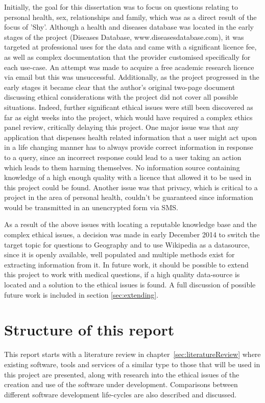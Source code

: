 \documentclass[authoryearcitations]{UoYCSproject}
\begin{document}
Initially, the goal for this dissertation was to focus on questions relating to personal health, sex, relationships and family, which was as a direct result of the focus of 'Shy'.  Although a health and diseases database was located in the early stages of the project (Diseases Database, www.diseasesdatabase.com), it was targeted at professional uses for the data and came with a significant licence fee, as well as complex documentation that the provider customised specifically for each use-case.  An attempt was made to acquire a free academic research licence via email but this was unsuccessful.  Additionally, as the project progressed in the early stages it became clear that the author's original two-page document discussing ethical considerations with the project did not cover all possible situations.  Indeed, further significant ethical issues were still been discovered as far as eight weeks into the project, which would have required a complex ethics panel review, critically delaying this project.  One major issue was that any application that dispenses health related information that a user might act upon in a life changing manner has to always provide correct information in response to a query, since an incorrect response could lead to a user taking an action which leads to them harming themselves. No information source containing knowledge of a high enough quality with a licence that allowed it to be used in this project could be found. Another issue was that privacy, which is critical to a project in the area of personal health, couldn't be guaranteed since information would be transmitted in an unencrypted form via SMS.

As a result of the above issues with locating a reputable knowledge base and the complex ethical issues, a decision was made in early December 2014 to switch the target topic for questions to Geography and to use Wikipedia as a datasource, since it is openly available, well populated and multiple methods exist for extracting information from it.  In future work, it should be possible to extend this project to work with medical questions, if a high quality data-source is located and a solution to the ethical issues is found. A full discussion of possible future work is included in section \ref{sec:extending}.

\section{Structure of this report}
This report starts with a literature review in chapter~\ref{sec:literatureReview} where existing software, tools and services of a similar type to those that will be used in this project are presented, along with research into the ethical issues of the creation and use of the software under development. Comparisons between different software development life-cycles are also described and discussed.
\end{document}
